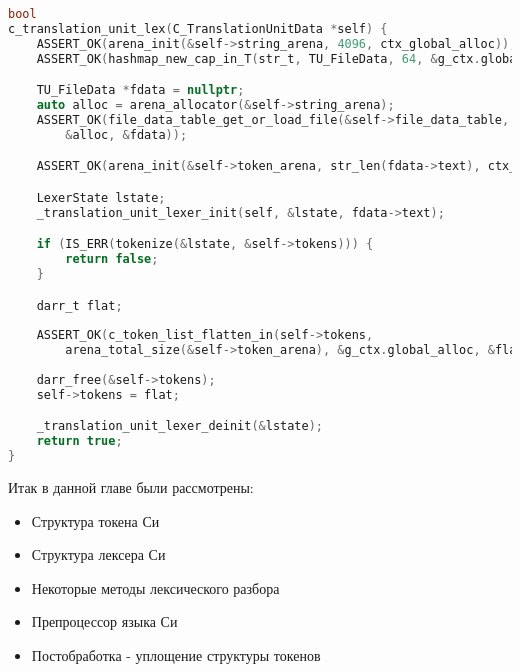 \begin{lstlisting}[language=c, caption={Функция этапа лексического разбора}, label={lexing:flat-fns}]
bool
c_translation_unit_lex(C_TranslationUnitData *self) {
    ASSERT_OK(arena_init(&self->string_arena, 4096, ctx_global_alloc));
    ASSERT_OK(hashmap_new_cap_in_T(str_t, TU_FileData, 64, &g_ctx.global_alloc, &self->file_data_table));

    TU_FileData *fdata = nullptr;
    auto alloc = arena_allocator(&self->string_arena);
    ASSERT_OK(file_data_table_get_or_load_file(&self->file_data_table, self->main_file, nullptr, 
        &alloc, &fdata));

    ASSERT_OK(arena_init(&self->token_arena, str_len(fdata->text), ctx_global_alloc));

    LexerState lstate;
    _translation_unit_lexer_init(self, &lstate, fdata->text);

    if (IS_ERR(tokenize(&lstate, &self->tokens))) {
        return false;
    }

    darr_t flat;
    
    ASSERT_OK(c_token_list_flatten_in(self->tokens, 
        arena_total_size(&self->token_arena), &g_ctx.global_alloc, &flat));
    
    darr_free(&self->tokens);
    self->tokens = flat;

    _translation_unit_lexer_deinit(&lstate);
    return true;
}
\end{lstlisting}

Итак в данной главе были рассмотрены:
\begin{itemize}
  \item Структура токена Си
  \item Структура лексера Си
  \item Некоторые методы лексического разбора
  \item Препроцессор языка Си
  \item Постобработка - уплощение структуры токенов
\end{itemize}